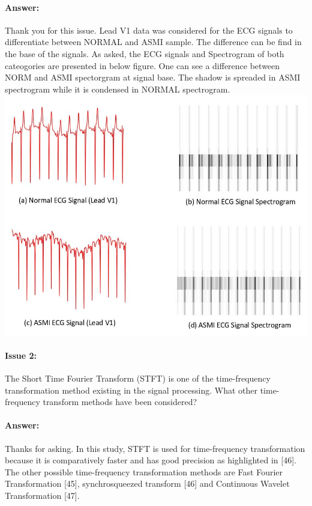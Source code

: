 \documentclass{article}
\begin{document}
\paragraph{Answer:}
Thank you for this issue. Lead V1 data was considered for the ECG signals to differentiate between NORMAL and ASMI sample. The difference can be find in the base of the signals. As asked, the ECG signals and Spectrogram of both cateogories are presented in below figure. One can see a difference between NORM and ASMI spectorgram at signal base. The shadow is spreaded in ASMI spectrogram while it is condensed in NORMAL spectrogram. 
\includegraphics[scale=0.55]{Signal and spectrogram img.JPG}


\paragraph{Issue 2:}
\begin{displayquote}
 The Short Time Fourier Transform (STFT) is one of the time-frequency transformation method existing in the signal processing. What other time-frequency transform methods have been considered?
\end{displayquote}

\paragraph{Answer:}
Thanks for asking. In this study, STFT is used for time-frequency transformation because it is comparatively faster and has good precision as highlighted in [46]. The other possible time-frequency transformation methods are Fast Fourier Transformation [45], synchrosqueezed transform [46] and  Continuous Wavelet Transformation [47]. 
‌
\end{document}
